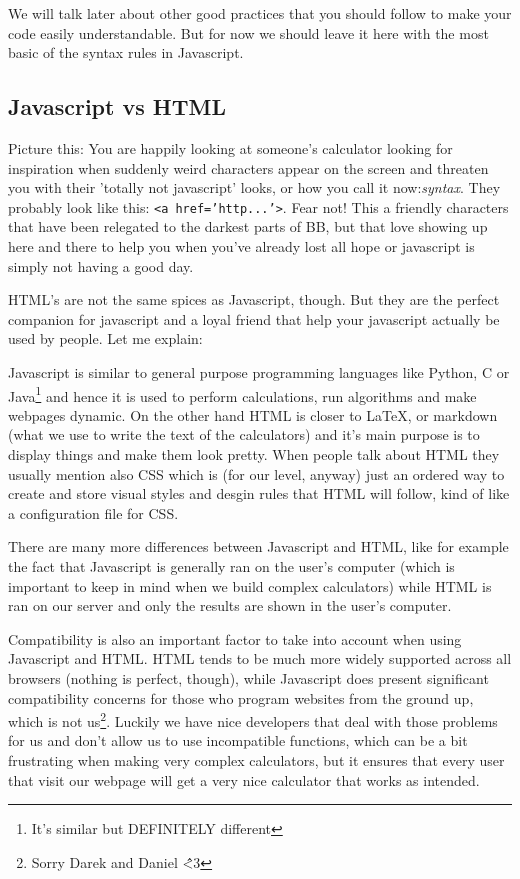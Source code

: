 We will talk later about other good practices that you should follow to make your code easily understandable. But for now we should leave it here with the most basic of the syntax rules in Javascript.

\subsection{Javascript vs HTML}
\label{sub:jsHtml}
Picture this: You are happily looking at someone's calculator looking for inspiration when suddenly weird characters appear on the screen and threaten you with their 'totally not javascript' looks, or how you call it now:\textit{syntax}. They probably look like this: \texttt{<a href='http...'>}. Fear not! This a friendly characters that have been relegated to the darkest parts of BB, but that love showing up here and there to help you when you've already lost all hope or javascript is simply not having a good day. 

HTML's are not the same spices as Javascript, though. But they are the perfect companion for javascript and a loyal friend that help your javascript actually be used by people. Let me explain:

Javascript is similar to general purpose programming languages like Python, C or Java\footnote{It's similar but DEFINITELY different} and hence it is used to perform calculations, run algorithms and make webpages dynamic. On the other hand HTML is closer to \LaTeX, or markdown (what we use to write the text of the calculators) and it's main purpose is to display things and make them look pretty. When people talk about HTML they usually mention also CSS which is (for our level, anyway) just an ordered way to create and store visual styles and desgin rules that HTML will follow, kind of like a configuration file for CSS.

There are many more differences between Javascript and HTML, like for example the fact that Javascript is generally ran on the user's computer (which is important to keep in mind when we build complex calculators) while HTML is ran on our server and only the results are shown in the user's computer. 

Compatibility is also an important factor to take into account when using Javascript and HTML. HTML tends to be much more widely supported across all browsers (nothing is perfect, though), while Javascript does present significant compatibility concerns for those who program websites from the ground up, which is not us\footnote{Sorry Darek and Daniel \^\^ <3}. Luckily we have nice developers that deal with those problems for us and don't allow us to use incompatible functions, which can be a bit frustrating when making very complex calculators, but it ensures that every user that visit our webpage will get a very nice calculator that works as intended.

